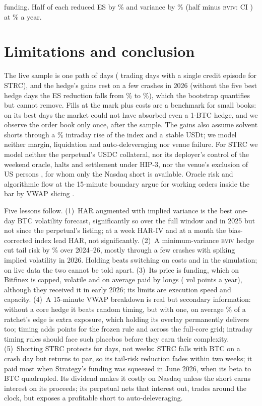 \documentclass[10pt,a4paper]{article}
\newcommand{\BVIV}{\textsc{bviv}}
\begin{document}
funding. Half of each reduced ES by \StrcHalfEs\% and variance by \StrcHalfVar\% (half minus \BVIV: CI \StrcHalfBvivVarCi) at \StrcHalfCost\% a year.

\section{Limitations and conclusion}\label{sec:conclusion}

The live sample is one path of \LiveEvalDays{} days (\StrcEvalDays{} trading days with a single credit episode for STRC), and the hedge's gains rest on a few crashes in 2026 (without the five best hedge days the ES reduction falls from \LiveEsAlways\% to \LiveEsExFive\%), which the bootstrap quantifies but cannot remove. Fills at the mark plus costs are a benchmark for small books: on its best days the market could not have absorbed even a 1-BTC hedge, and we observe the order book only once, after the sample. The gains also assume solvent shorts through a \LiveEpRise\% intraday rise of the index and a stable USDt; we model neither margin, liquidation and auto-deleveraging nor venue failure. For STRC we model neither the perpetual's USDC collateral, nor its deployer's control of the weekend oracle, halts and settlement under HIP-3, nor the venue's exclusion of US persons \citep{tradexyz2026docs}, for whom only the Nasdaq short is available. Oracle risk \citep{hyperliquid2026funding} and algorithmic flow at the 15-minute boundary \citep{kim2026quarter} argue for working orders inside the bar by VWAP slicing \citep{berkowitz1988total,konishi2002optimal,bialkowski2008improving}.

Five lessons follow. (1)~HAR augmented with implied variance is the best one-day BTC volatility forecast, significantly so over the full window and in 2025 but not since the perpetual's listing; at a week HAR-IV and at a month the bias-corrected index lead HAR, not significantly. (2)~A minimum-variance \BVIV{} hedge cut tail risk by \LiveEsAlways\% over 2024--26, mostly through a few crashes with spiking implied volatility in 2026. Holding beats switching on costs and in the simulation; on live data the two cannot be told apart. (3)~Its price is funding, which on Bitfinex is capped, volatile and on average paid by longs (\LiveFundAnnualPts{} vol points a year), although they received it in early 2026; its limits are execution speed and capacity. (4)~A 15-minute VWAP breakdown is real but secondary information: without a core hedge it beats random timing, but with one, on average \LiveGridExposureShare\% of a ratchet's edge is extra exposure, which holding its overlay permanently delivers too; timing adds \LiveTiming{} points for the frozen rule and \LiveGridOne{} across the full-core grid; intraday timing rules should face such placebos before they earn their complexity. (5)~Shorting STRC protects for days, not weeks: STRC falls with BTC on a crash day but returns to par, so its tail-risk reduction fades within two weeks; it paid most when Strategy's funding was squeezed in June 2026, when its beta to BTC quadrupled. Its dividend makes it costly on Nasdaq unless the short earns interest on its proceeds; its perpetual nets that interest out, trades around the clock, but exposes a profitable short to auto-deleveraging.
\end{document}
